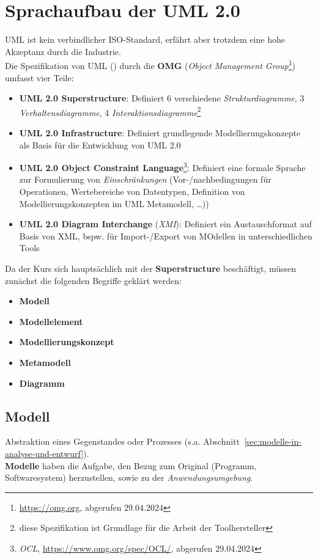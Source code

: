 \section{Sprachaufbau der UML 2.0}

UML ist kein verbindlicher ISO-Standard, erfährt aber trotzdem eine hohe Akzeptanz durch die Industrie.\\

Die Spezifikation von UML (\cite{UML17}) durch die \textbf{OMG} (\textit{Object Management Group}\footnote{
    \url{https://omg.org}, abgerufen 29.04.2024
}) umfasst vier Teile:

\begin{itemize}
    \item \textbf{UML 2.0 Superstructure}: Definiert 6 verschiedene \textit{Strukturdiagramme}, 3 \textit{Verhaltensdiagramme}, 4 \textit{Interaktionsdiagramme}\footnote{
    diese Spezifikation ist Grundlage für die Arbeit der Toolhersteller
    }
    \item \textbf{UML 2.0 Infrastructure}: Definiert grundlegende Modellierungskonzepte als Basis für die Entwicklung von UML 2.0
    \item \textbf{UML 2.0 Object Constraint Language}\footnote{
    \textit{OCL}, \url{https://www.omg.org/spec/OCL/}, abgerufen 29.04.2024
    }: Definiert eine formale Sprache zur Formulierung von \textit{Einschränkungen} (Vor-/nachbedingungen für Operationen, Wertebereiche von Datentypen, Definition von Modellierungskonzepten im UML Metamodell, \ldots))
    \item \textbf{UML 2.0 Diagram Interchange} (\textit{XMI}): Definiert ein Austauschformat auf Basis von XML, bspw. für Import-/Export von MOdellen in unterschiedlichen Tools
\end{itemize}


\noindent
Da der Kurs sich hauptsächlich mit der \textbf{Superstructure} beschäftigt, müssen zunächst die folgenden Begriffe geklärt werden:

\begin{itemize}
    \item \textbf{Modell}
    \item \textbf{Modellelement}
    \item \textbf{Modellierungskonzept}
    \item \textbf{Metamodell}
    \item \textbf{Diagramm}
\end{itemize}

\subsection*{Modell}
Abstraktion eines Gegenstandes oder Prozesses (s.a. Abschnitt~\ref{sec:modelle-in-analyse-und-entwurf}).\\
\textbf{Modelle} haben die Aufgabe, den Bezug zum Original (Programm, Softwaresystem) herzustellen, sowie zu der \textit{Anwendungsumgebung}.\\


